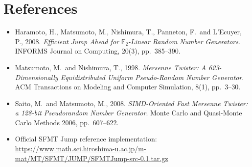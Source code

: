 \documentclass{article}
\begin{document}
\section{References}

\begin{itemize}
  \item Haramoto, H., Matsumoto, M., Nishimura, T., Panneton, F.\ and L'Ecuyer, P., 2008.
        \textit{Efficient Jump Ahead for $\mathbb{F}_2$-Linear Random Number Generators}.
        INFORMS Journal on Computing, 20(3), pp.\ 385--390.
  \item Matsumoto, M.\ and Nishimura, T., 1998.
        \textit{Mersenne Twister: A 623-Dimensionally Equidistributed Uniform
        Pseudo-Random Number Generator}.
        ACM Transactions on Modeling and Computer Simulation, 8(1), pp.\ 3--30.
  \item Saito, M.\ and Matsumoto, M., 2008.
        \textit{SIMD-Oriented Fast Mersenne Twister: a 128-bit Pseudorandom Number
        Generator}.
        Monte Carlo and Quasi-Monte Carlo Methods 2006, pp.\ 607--622.
  \item Official SFMT Jump reference implementation:
        \url{https://www.math.sci.hiroshima-u.ac.jp/m-mat/MT/SFMT/JUMP/SFMTJump-src-0.1.tar.gz}
\end{itemize}
\end{document}
